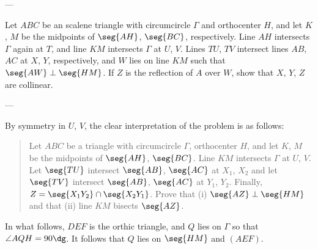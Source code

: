 
---

Let $ABC$ be an scalene triangle with circumcircle $\Gamma$ and orthocenter $H$, and let $K$, $M$ be the midpoints of $\seg{AH}$, $\seg{BC}$, respectively. Line $AH$ intersects $\Gamma$ again at $T$, and line $KM$ intersects $\Gamma$ at $U$, $V$. Lines $TU$, $TV$ intersect lines $AB$, $AC$ at $X$, $Y$, respectively, and $W$ lies on line $KM$ such that $\seg{AW}\perp\seg{HM}$. If $Z$ is the reflection of $A$ over $W$, show that $X$, $Y$, $Z$ are collinear.

---

By symmetry in $U$, $V$, the clear interpretation of the problem is as follows:
\begin{quote}
    Let $ABC$ be a triangle with circumcircle $\Gamma$, orthocenter $H$, and let $K$, $M$ be the midpoints of $\seg{AH}$, $\seg{BC}$. Line $KM$ intersects $\Gamma$ at $U$, $V$. Let $\seg{TU}$ intersect $\seg{AB}$, $\seg{AC}$ at $X_1$, $X_2$ and let $\seg{TV}$ intersect $\seg{AB}$, $\seg{AC}$ at $Y_1$, $Y_2$. Finally, $Z=\seg{X_1Y_2}\cap\seg{X_2Y_1}$.
    Prove that (i) $\seg{AZ}\perp\seg{HM}$ and that (ii) line $KM$ bisects $\seg{AZ}$.
\end{quote}
In what follows, $DEF$ is the orthic triangle, and $Q$ lies on $\Gamma$ so that $\angle AQH=90\dg$. It follows that $Q$ lies on $\seg{HM}$ and $(AEF)$.
